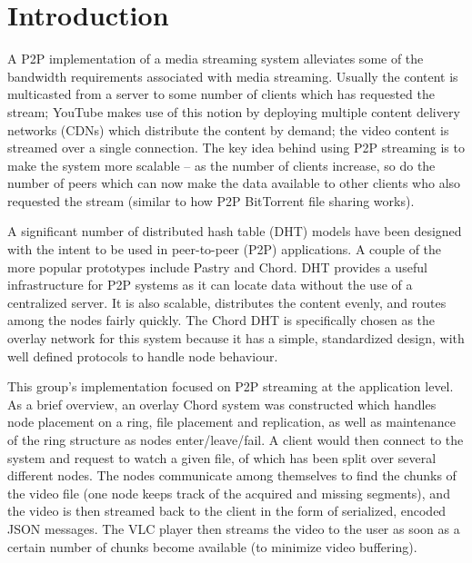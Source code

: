 \documentclass[fleqn,24pt]{SelfArx} %
\affiliation{\textsuperscript{1}\textit{y9u8, ialcuaz@alumni.ubc.ca}} %
\affiliation{\textsuperscript{2}\textit{i2u9a, shariqazz15@gmail.com}} %
\affiliation{\textsuperscript{3}\textit{o3d7, mimi@dbzmail.com}} %
\affiliation{\textsuperscript{4}\textit{i1u9a, abrar.musa.89@gmail.com}} %
\begin{document}
\flushbottom %

\maketitle %

\tableofcontents

\thispagestyle{empty} %


\section{Introduction} %

A P2P implementation of a media streaming system alleviates some of the bandwidth requirements associated with media streaming. Usually the content is multicasted from a server to some number of clients which has requested the stream; YouTube makes use of this notion by deploying multiple content delivery networks (CDNs) which distribute the content by demand; the video content is streamed over a single connection. The key idea behind using P2P streaming is to make the system more scalable -- as the number of clients increase, so do the number of peers which can now make the data available to other clients who also requested the stream (similar to how P2P BitTorrent file sharing works).

A significant number of distributed hash table (DHT) models have been designed with the intent to be used in peer-to-peer (P2P) applications. A couple of the more popular prototypes include Pastry \cite{3} and Chord\cite{2}. DHT provides a useful infrastructure for P2P systems as it can locate data without the use of a centralized server. It is also scalable, distributes the content evenly, and routes among the nodes fairly quickly. The Chord DHT is specifically chosen as the overlay network for this system because it has a simple, standardized design, with well defined protocols to handle node behaviour.

This group's implementation focused on P2P streaming at the application level. As a brief overview, an overlay Chord system was constructed which handles node placement on a ring, file placement and replication, as well as maintenance of the ring structure as nodes enter/leave/fail. A client would then connect to the system and request to watch a given file, of which has been split over several different nodes. The nodes communicate among themselves to find the chunks of the video file (one node keeps track of the acquired and missing segments), and the video is then streamed back to the client in the form of serialized, encoded JSON messages. The VLC player then streams the video to the user as soon as a certain number of chunks become available (to minimize video buffering).
\end{document}
